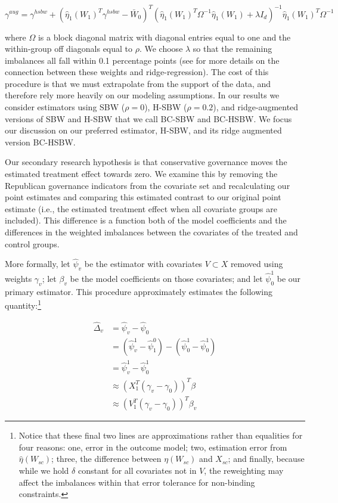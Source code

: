 \documentclass[aoas]{imsart}
\theoremstyle{plain}
\theoremstyle{remark}
\begin{document}
$$
\gamma^{aug} = \gamma^{hsbw} + (\hat{\eta}_1(W_1)^T\gamma^{hsbw} - \bar{W}_0)^T(\hat{\eta}_1(W_1)^T\Omega^{-1}\hat{\eta}_1(W_1) + \lambda I_d)^{-1}\hat{\eta}_1(W_1)^T\Omega^{-1}
$$

where $\Omega$ is a block diagonal matrix with diagonal entries equal to one and the within-group off diagonals equal to $\rho$. We choose $\lambda$ so that the remaining imbalances all fall within 0.1 percentage points (see \cite{ben2018augmented} for more details on the connection between these weights and ridge-regression). The cost of this procedure is that we must extrapolate from the support of the data, and therefore rely more heavily on our modeling assumptions. In our results we consider estimators using SBW ($\rho = 0$), H-SBW ($\rho = 0.2$), and ridge-augmented versions of SBW and H-SBW that we call BC-SBW and BC-HSBW. We focus our discussion on our preferred estimator, H-SBW, and its ridge augmented version BC-HSBW. 

Our secondary research hypothesis is that conservative governance moves the estimated treatment effect towards zero. We examine this by removing the Republican governance indicators from the covariate set and recalculating our point estimates and comparing this estimated contrast to our original point estimate (i.e., the estimated treatment effect when all covariate groups are included). This difference is a function both of the model coefficients and the differences in the weighted imbalances between the covariates of the treated and control groups.

More formally, let $\hat{\psi}_v$ be the estimator with covariates $V \subset X$ removed using weights $\gamma_v$; let $\beta_v$ be the model coefficients on those covariates; and let $\hat{\psi}^1_0$ be our primary estimator. This procedure approximately estimates the following quantity:\footnote{Notice that these final two lines are approximations rather than equalities for four reasons: one, error in the outcome model; two, estimation error from $\hat{\eta}(W_{sc})$; three, the difference between $\eta(W_{sc})$ and $X_{sc}$; and finally, because while we hold $\delta$ constant for all covariates not in $V$, the reweighting may affect the imbalances within that error tolerance for non-binding constraints.}

\begin{align*}
    \hat{\Delta}_v &= \hat{\psi}_v - \hat{\psi}_0 \\
    &= (\hat{\psi}^1_v - \hat{\psi}^0_1)  - (\hat{\psi}^1_0 - \hat{\psi}^1_0) \\
    &= \hat{\psi}^1_v - \hat{\psi}^1_0 \\
    &\approx (X_1^T(\gamma_v - \gamma_0))^T\beta \\
    &\approx (V_1^T(\gamma_v - \gamma_0))^T\beta_v
\end{align*}
\end{document}
